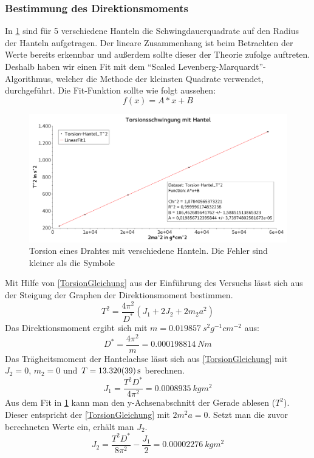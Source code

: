 \documentclass[
	a4paper,
	12pt,
	pagesize,
	ngerman
]{scrartcl}
\begin{document}
	\subsubsection*{Bestimmung des Direktionsmoments}
	In \cref{TorsionGraph} sind für 5 verschiedene Hanteln die Schwingdauerquadrate auf den Radius der Hanteln aufgetragen. Der lineare Zusammenhang ist beim Betrachten der Werte bereits erkennbar und außerdem sollte dieser der Theorie zufolge auftreten. Deshalb haben wir einen Fit mit dem \enquote{Scaled Levenberg-Marquardt}-Algorithmus, welcher die Methode der kleinsten Quadrate verwendet, durchgeführt. Die Fit-Funktion sollte wie folgt aussehen:
	\begin{equation}
		f(x)=A*x+B
	\end{equation}
	\begin{figure}[H]
		\includegraphics[width=1\textwidth]{Torsion}
		\centering
		\caption{Torsion eines Drahtes mit verschiedene Hanteln. Die Fehler sind kleiner als die Symbole}
		\label{TorsionGraph}
		\centering
	\end{figure}
	Mit Hilfe von \cref{TorsionGleichung} aus der Einführung des Versuchs lässt sich aus der Steigung der Graphen der Direktionsmoment bestimmen.
	\begin{equation}
		\label{TorsionGleichung}
		T^2 = \frac{4\pi^2}{D^*} (J_1 + 2J_2 + 2m_2 a^2)
	\end{equation}
	Das Direktionsmoment ergibt sich mit $m=\SI{0,019857}{s^2g^{-1}cm^{-2}}$ aus:
	\begin{equation}
		D^* = \frac{4\pi^2}{m} = \SI{0,000198814}{Nm} %
	\end{equation}
	Das Trägheitsmoment der Hantelachse lässt sich aus \cref{TorsionGleichung} mit $J_2=0$, $m_2=0$ und $T=\SI{13,32 \pm0,039}{s}$ berechnen.
	\begin{equation}
		J_1= \frac{T^2D^*}{4\pi^2} = \SI{0,0008935}{kgm^2}
	\end{equation}
	Aus dem Fit in \cref{TorsionGraph} kann man den y-Achsenabschnitt der Gerade ablesen ($T^2$). Dieser entspricht der \cref{TorsionGleichung} mit $2m^2a=0$. Setzt man die zuvor berechneten Werte ein, erhält man $J_2$.
	\begin{equation}
		J_2 = \frac{T^2D^*}{8\pi^2} - \frac{J_1}{2} = \SI{0,00002276}{kgm^2}
	\end{equation}
\end{document}
